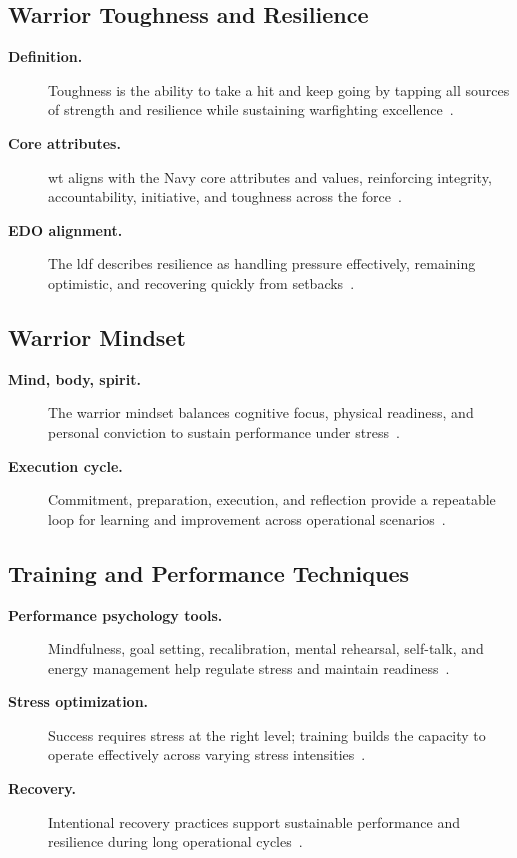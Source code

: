 \documentclass[../main.tex]{subfiles}
\begin{document}
\subsection{Warrior Toughness and Resilience}
\begin{description}
  \item[\textbf{Definition.}] Toughness is the ability to take a hit and keep going by tapping all sources of
  strength and resilience while sustaining warfighting excellence~\autocite{edo-5-2-8-warrior-toughness-2025}.
  \item[\textbf{Core attributes.}] \ac{wt} aligns with the Navy core attributes and values, reinforcing
  integrity, accountability, initiative, and toughness across the force~\autocite{edo-5-2-8-warrior-toughness-2025,NETC-Warrior-Toughness-Components-2026}.
  \item[\textbf{EDO alignment.}] The \ac{ldf} describes resilience as handling pressure effectively,
  remaining optimistic, and recovering quickly from setbacks~\autocite{edo-5-2-8-warrior-toughness-2025}.
\end{description}

\subsection{Warrior Mindset}
\begin{description}
  \item[\textbf{Mind, body, spirit.}] The warrior mindset balances cognitive focus, physical readiness, and
  personal conviction to sustain performance under stress~\autocite{edo-5-2-8-warrior-toughness-2025,NETC-Warrior-Toughness-2026}.
  \item[\textbf{Execution cycle.}] Commitment, preparation, execution, and reflection provide a repeatable
  loop for learning and improvement across operational scenarios~\autocite{edo-5-2-8-warrior-toughness-2025,NETC-Warrior-Toughness-Components-2026}.
\end{description}

\subsection{Training and Performance Techniques}
\begin{description}
  \item[\textbf{Performance psychology tools.}] Mindfulness, goal setting, recalibration, mental rehearsal,
  self-talk, and energy management help regulate stress and maintain readiness~\autocite{edo-5-2-8-warrior-toughness-2025,NETC-Warrior-Toughness-Components-2026}.
  \item[\textbf{Stress optimization.}] Success requires stress at the right level; training builds the capacity
  to operate effectively across varying stress intensities~\autocite{edo-5-2-8-warrior-toughness-2025}.
  \item[\textbf{Recovery.}] Intentional recovery practices support sustainable performance and resilience
  during long operational cycles~\autocite{edo-5-2-8-warrior-toughness-2025}.
\end{description}
\end{document}
